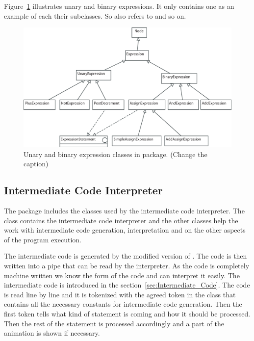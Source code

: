 Figure~\ref{fig:un_and_bin_exp_classes} illustrates unary and
binary expressions. It only contains one as an example of each
their subclasses. So  also refers to
 and so on.

\begin{figure}[!htb]
\begin{center}
\includegraphics[width=\textwidth]{images/unary-bin-exps.eps}
\caption{Unary and binary expression classes in  package. (Change the caption)}
\label{fig:un_and_bin_exp_classes}
\end{center}
\end{figure}

\subsection{Intermediate Code Interpreter}
\label{sec:Intermediate_Code_Interpreter}

The package  includes the classes used by the intermediate
code interpreter. The class  contains the intermediate code
interpreter and the other classes  help the work with intermediate
code generation, interpretation and on the other aspects of the program execution.

The intermediate code is generated by the modified version of \djava{}. The code is
then written into a pipe that can be read by the interpreter. As the code is completely
machine written we know the form of the code and can interpret it easily. The intermediate
code is introduced in the section~\ref{sec:Intermediate_Code}. The code is read
line by line and it is tokenized with the agreed token in the class  that contains
all the necessary constants for intermediate code generation. Then the first token tells what kind of statement is coming and how it should be processed. Then the rest of the statement is processed accordingly and a part of the animation is shown if necessary.

